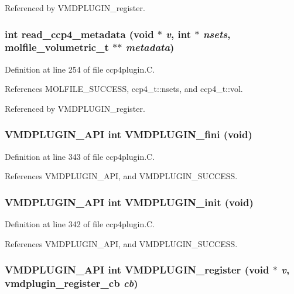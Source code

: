 Referenced by VMDPLUGIN\_\-register.
\subsubsection{\setlength{\rightskip}{0pt plus 5cm}int read\_\-ccp4\_\-metadata (void $\ast$ {\em v}, int $\ast$ {\em nsets}, {\bf molfile\_\-volumetric\_\-t} $\ast$$\ast$ {\em metadata})\hspace{0.3cm}{\tt  [static]}}\label{ccp4plugin_8C_a4}




Definition at line 254 of file ccp4plugin.C.

References MOLFILE\_\-SUCCESS, ccp4\_\-t::nsets, and ccp4\_\-t::vol.

Referenced by VMDPLUGIN\_\-register.
\subsubsection{\setlength{\rightskip}{0pt plus 5cm}VMDPLUGIN\_\-API int VMDPLUGIN\_\-fini (void)}\label{ccp4plugin_8C_a8}




Definition at line 343 of file ccp4plugin.C.

References VMDPLUGIN\_\-API, and VMDPLUGIN\_\-SUCCESS.
\subsubsection{\setlength{\rightskip}{0pt plus 5cm}VMDPLUGIN\_\-API int VMDPLUGIN\_\-init (void)}\label{ccp4plugin_8C_a7}




Definition at line 342 of file ccp4plugin.C.

References VMDPLUGIN\_\-API, and VMDPLUGIN\_\-SUCCESS.
\subsubsection{\setlength{\rightskip}{0pt plus 5cm}VMDPLUGIN\_\-API int VMDPLUGIN\_\-register (void $\ast$ {\em v}, {\bf vmdplugin\_\-register\_\-cb} {\em cb})}\label{ccp4plugin_8C_a9}




